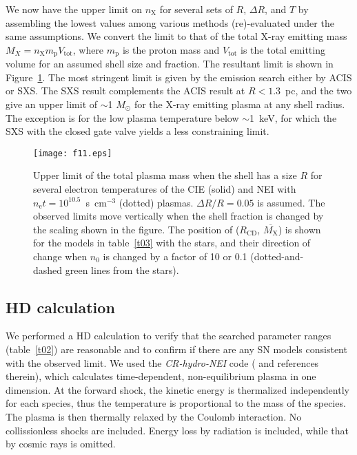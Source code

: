 \documentclass[]{pasj01}
\begin{document}
\smallskip

We now have the upper limit on $n_{\mathrm{X}}$ for several sets of $R$, $\Delta R$, and
$T$ by assembling the lowest values among various methods (re)-evaluated under the same
assumptions. We convert the limit to that of the total X-ray emitting mass
$M_{X}=n_{\mathrm{X}}m_{\mathrm{p}}V_{\mathrm{tot}}$, where $m_{\mathrm{p}}$ is the
proton mass and $V_{\mathrm{tot}}$ is the total emitting volume for an assumed shell
size and fraction. The resultant limit is shown in Figure~\ref{f11}. The most stringent
limit is given by the emission search either by ACIS or SXS. The SXS result complements
the ACIS result at $R<1.3$~pc, and the two give an upper limit of $\sim$1 $M_{\odot}$
for the X-ray emitting plasma at any shell radius. The exception is for the low plasma
temperature below $\sim$1~keV, for which the SXS with the closed gate valve yields a
less constraining limit.

\begin{figure}
 \begin{center}
  \texttt{[image: f11.eps]}
 \end{center}
 \caption{Upper limit of the total plasma mass when the shell has a size $R$ for several
 electron temperatures of the CIE (solid) and NEI with
 $n_{\mathrm{e}}t=10^{10.5}$~s~cm$^{-3}$ (dotted) plasmas. $\Delta R/R=0.05$ is
 assumed. The observed limits move vertically when the shell fraction is changed by the
 scaling shown in the figure. The position of ($R_{\mathrm{CD}}$,
 $\overline{M_{\mathrm{X}}}$) is shown for the models in table~\ref{t03} with the stars,
 and their direction of change when $n_{0}$ is changed by a factor of 10 or 0.1 (dotted-and-dashed
 green lines from the stars).}
\label{f11}
\end{figure}


\subsection{HD calculation}\label{s4-3}
We performed a HD calculation to verify that the searched parameter ranges
(table~\ref{t02}) are reasonable and to confirm if there are any SN models consistent
with the observed limit. We used the \textit{CR-hydro-NEI} code (\cite{lee14} and
references therein), which calculates time-dependent, non-equilibrium plasma in one
dimension. At the forward shock, the kinetic energy is thermalized independently for
each species, thus the temperature is proportional to the mass of the species. The
plasma is then thermally relaxed by the Coulomb interaction. No collissionless shocks
are included. Energy loss by radiation is included, while that by cosmic rays is
omitted.
\end{document}
